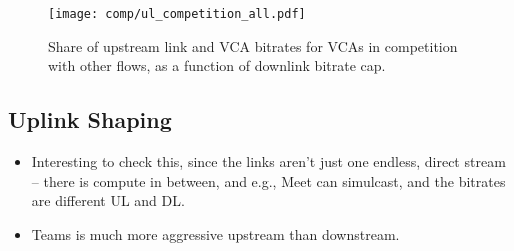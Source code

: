 \begin{figure}[t]
    \texttt{[image: comp/ul\_competition\_all.pdf]}
    \caption{Share of upstream link and VCA bitrates for VCAs in competition with other flows, as a function of downlink bitrate cap.}
	\label{fig:comp_bitrates_ul}
\end{figure}
\subsection{Uplink Shaping}

\begin{itemize}
    \item Interesting to check this, since the links aren't just one endless, direct stream -- there is compute in between, and e.g., Meet can simulcast, and the bitrates are different UL and DL.
    \item Teams is much more aggressive upstream than downstream.
\end{itemize}






